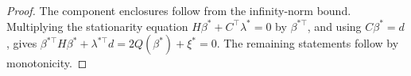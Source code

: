 \begin{proof}
The component enclosures follow from the infinity-norm bound.  Multiplying
the stationarity equation \(H\beta^*+C^\top\lambda^*=0\) by
\(\beta^{*\top}\), and using \(C\beta^*=d\), gives
\(\beta^{*\top}H\beta^*+\lambda^{*\top}d=2Q(\beta^*)+\xi^*=0\).
The remaining statements follow by monotonicity.
\end{proof}
